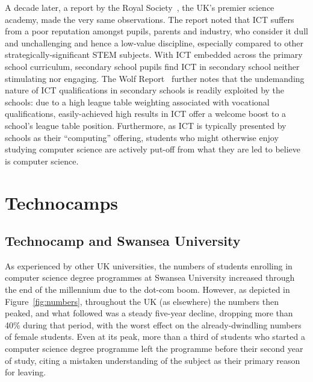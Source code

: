 \documentclass{sig-alternate}
\begin{document}
A decade later, a report by the Royal Society~\cite{RoyalSoc:2012},
the UK's premier science academy, made the very same observations.
The report noted that ICT suffers from a poor reputation amongst
pupils, parents and industry, who consider it dull and unchallenging
and hence a low-value discipline, especially compared to other
strategically-significant STEM subjects.  With ICT embedded across the
primary school curriculum, secondary school pupils find ICT in
secondary school neither stimulating nor engaging. The Wolf
Report~\cite{Wolf:2011} further notes that the undemanding nature of
ICT qualifications in secondary schools is readily exploited by the
schools: due to a high league table weighting associated with
vocational qualifications, easily-achieved high results in ICT offer a
welcome boost to a school's league table position. Furthermore, as ICT
is typically presented by schools as their ``computing'' offering,
students who might otherwise enjoy studying computer science are
actively put-off from what they are led to believe is computer
science.

\section{Technocamps}\label{technocamps}

\subsection{Technocamp and Swansea University}

As experienced by other UK universities, the numbers of students
enrolling in computer science degree programmes at Swansea University
increased through the end of the millennium due to the dot-com boom.
However, as depicted in Figure~\ref{fig:numbers}, throughout the UK
(as elsewhere) the numbers then peaked, and what followed was a steady
five-year decline, dropping more than 40\% during that period, with
the worst effect on the already-dwindling numbers of female students.
Even at its peak, more than a third of students who started a computer
science degree programme left the programme before their second year
of study, citing a mistaken understanding of the subject as their
primary reason for leaving.
\end{document}
